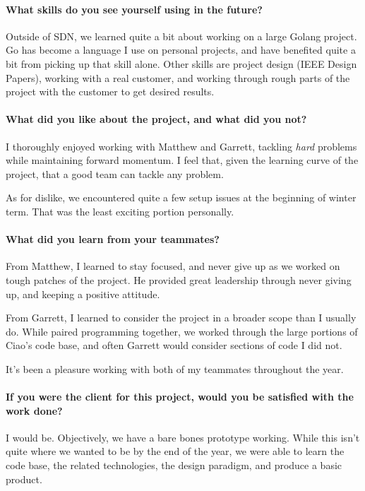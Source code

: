 \documentclass[10pt,onecolumn,journal,draftclsnofoot]{IEEEtran}
\begin{document}
\paragraph{What skills do you see yourself using in the future?}

Outside of SDN, we learned quite a bit about working on a large Golang
project. Go has become a language I use on personal projects, and have
benefited quite a bit from picking up that skill alone. Other skills are
project design (IEEE Design Papers), working with a real customer, and
working through rough parts of the project with the customer to get
desired results.

\paragraph{What did you like about the project, and what did you not?}

I thoroughly enjoyed working with Matthew and Garrett, tackling
\emph{hard} problems while maintaining forward momentum. I feel that,
given the learning curve of the project, that a good team can tackle any
problem.

As for dislike, we encountered quite a few setup issues at the beginning
of winter term. That was the least exciting portion personally.

\paragraph{What did you learn from your teammates?}

From Matthew, I learned to stay focused, and never give up as we worked
on tough patches of the project. He provided great leadership through
never giving up, and keeping a positive attitude.

From Garrett, I learned to consider the project in a broader scope than
I usually do. While paired programming together, we worked through the
large portions of Ciao's code base, and often Garrett would consider
sections of code I did not.

It's been a pleasure working with both of my teammates throughout the
year.

\paragraph{If you were the client for this project, would you be satisfied with
  the work done?}

I would be. Objectively, we have a bare bones prototype working. While
this isn't quite where we wanted to be by the end of the year, we were
able to learn the code base, the related technologies, the design
paradigm, and produce a basic product.
\end{document}
